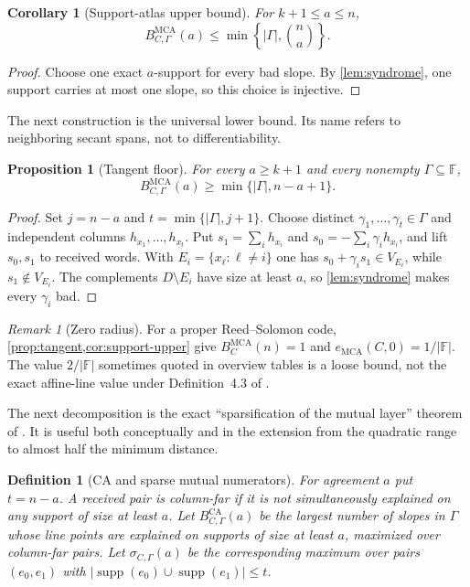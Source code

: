 \documentclass[11pt,a4paper]{amsart}
\numberwithin{equation}{section}
\newtheorem{proposition}[theorem]{Proposition}
\newtheorem{corollary}[theorem]{Corollary}
\newtheorem{definition}[theorem]{Definition}
\theoremstyle{remark}
\newtheorem{remark}[theorem]{Remark}
\DeclareMathOperator{\MCA}{MCA}
\DeclareMathOperator{\CA}{CA}
\DeclareMathOperator{\supp}{supp}
\newcommand{\F}{\mathbb F}
\newcommand{\abs}[1]{\lvert#1\rvert}
\begin{document}
\begin{corollary}[Support-atlas upper bound]\label{cor:support-upper}
For $k+1\le a\le n$,
\[
 B_{C,\Gamma}^{\MCA}(a)\le \min\left\{\abs\Gamma,\binom na\right\}.
\]
\end{corollary}

\begin{proof}
Choose one exact $a$-support for every bad slope.  By \cref{lem:syndrome}, one support carries at most one slope, so this choice is injective.
\end{proof}

The next construction is the universal lower bound.  Its name refers to neighboring secant spans, not to differentiability.

\begin{proposition}[Tangent floor]\label{prop:tangent}
For every $a\ge k+1$ and every nonempty $\Gamma\subseteq\F$,
\[
 B_{C,\Gamma}^{\MCA}(a)\ge \min\{\abs\Gamma,n-a+1\}.
\]
\end{proposition}

\begin{proof}
Set $j=n-a$ and $t=\min\{\abs\Gamma,j+1\}$.  Choose distinct $\gamma_1,\ldots,\gamma_t\in\Gamma$ and independent columns $h_{x_1},\ldots,h_{x_t}$.  Put $s_1=\sum_i h_{x_i}$ and $s_0=-\sum_i\gamma_i h_{x_i}$, and lift $s_0,s_1$ to received words.  With $E_i=\{x_\ell:\ell\ne i\}$ one has $s_0+\gamma_i s_1\in V_{E_i}$, while $s_1\notin V_{E_i}$.  The complements $D\setminus E_i$ have size at least $a$, so \cref{lem:syndrome} makes every $\gamma_i$ bad.
\end{proof}

\begin{remark}[Zero radius]
For a proper Reed--Solomon code, \cref{prop:tangent,cor:support-upper} give $B_C^{\MCA}(n)=1$ and $e_{\MCA}(C,0)=1/\abs\F$.  The value $2/\abs\F$ sometimes quoted in overview tables is a loose bound, not the exact affine-line value under Definition~4.3 of \cite{ABF26}.
\end{remark}


The next decomposition is the exact ``sparsification of the mutual layer'' theorem of \cite{ChoShort26}.  It is useful both conceptually and in the extension from the quadratic range to almost half the minimum distance.

\begin{definition}[CA and sparse mutual numerators]
For agreement $a$ put $t=n-a$.  A received pair is \emph{column-far} if it is not simultaneously explained on any support of size at least $a$.  Let $B_{C,\Gamma}^{\CA}(a)$ be the largest number of slopes in $\Gamma$ whose line points are explained on supports of size at least $a$, maximized over column-far pairs.  Let $\sigma_{C,\Gamma}(a)$ be the corresponding maximum over pairs $(e_0,e_1)$ with $|\supp(e_0)\cup\supp(e_1)|\le t$.
\end{definition}
\end{document}
